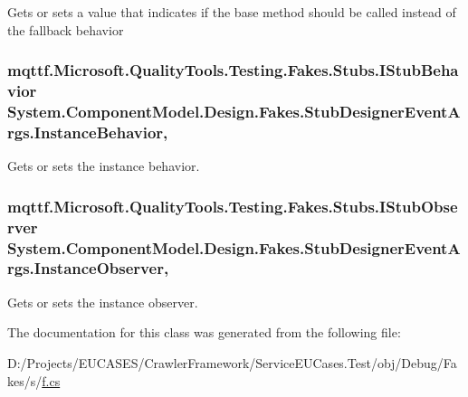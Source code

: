 Gets or sets a value that indicates if the base method should be called instead of the fallback behavior

\hypertarget{class_system_1_1_component_model_1_1_design_1_1_fakes_1_1_stub_designer_event_args_af6d7e08a48809bac32a4ab2cdf2e8a0a}{
\subsubsection[{Instance\-Behavior}]{\setlength{\rightskip}{0pt plus 5cm}mqttf.\-Microsoft.\-Quality\-Tools.\-Testing.\-Fakes.\-Stubs.\-I\-Stub\-Behavior System.\-Component\-Model.\-Design.\-Fakes.\-Stub\-Designer\-Event\-Args.\-Instance\-Behavior\hspace{0.3cm}{\ttfamily [get]}, {\ttfamily [set]}}}\label{class_system_1_1_component_model_1_1_design_1_1_fakes_1_1_stub_designer_event_args_af6d7e08a48809bac32a4ab2cdf2e8a0a}


Gets or sets the instance behavior.

\hypertarget{class_system_1_1_component_model_1_1_design_1_1_fakes_1_1_stub_designer_event_args_ac615161b55ced30cbc863699cc3e92c9}{
\subsubsection[{Instance\-Observer}]{\setlength{\rightskip}{0pt plus 5cm}mqttf.\-Microsoft.\-Quality\-Tools.\-Testing.\-Fakes.\-Stubs.\-I\-Stub\-Observer System.\-Component\-Model.\-Design.\-Fakes.\-Stub\-Designer\-Event\-Args.\-Instance\-Observer\hspace{0.3cm}{\ttfamily [get]}, {\ttfamily [set]}}}\label{class_system_1_1_component_model_1_1_design_1_1_fakes_1_1_stub_designer_event_args_ac615161b55ced30cbc863699cc3e92c9}


Gets or sets the instance observer.



The documentation for this class was generated from the following file\-:\begin{DoxyCompactItemize}
\item 
D\-:/\-Projects/\-E\-U\-C\-A\-S\-E\-S/\-Crawler\-Framework/\-Service\-E\-U\-Cases.\-Test/obj/\-Debug/\-Fakes/s/\hyperlink{s_2f_8cs}{f.\-cs}\end{DoxyCompactItemize}

